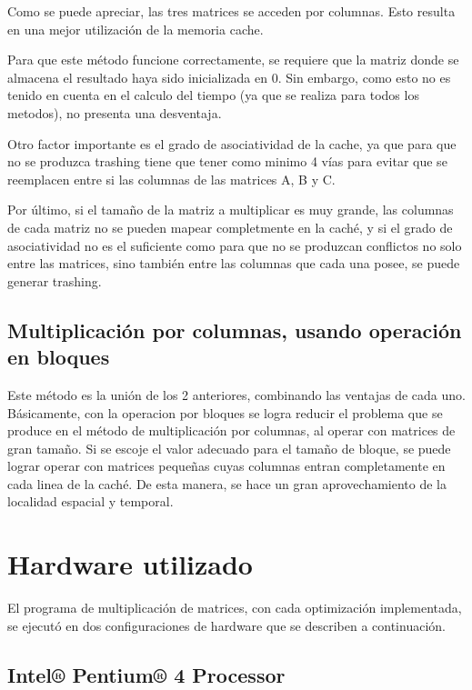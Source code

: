 \documentclass[a4paper,10pt]{article}
\begin{document}
Como se puede apreciar, las tres matrices se acceden por columnas. Esto resulta en una mejor utilización de la memoria cache.

Para que este método funcione correctamente, se requiere que la matriz donde se almacena el resultado haya sido inicializada en 0. Sin embargo, como esto no es tenido en cuenta en el calculo del tiempo (ya que se realiza para todos los metodos), no presenta una desventaja.

Otro factor importante es el grado de asociatividad de la cache, ya que para que no se produzca trashing tiene que tener como minimo 4 vías para evitar que se reemplacen entre si las columnas de las matrices A, B y C.

Por último, si el tamaño de la matriz a multiplicar es muy grande, las columnas de cada matriz no se pueden mapear completmente en la caché, y si el grado de asociatividad no es el suficiente como para que no se produzcan conflictos no solo entre las matrices, sino también entre las columnas que cada una posee, se puede generar trashing.

\subsection{Multiplicación por columnas, usando operación en bloques}

Este método es la unión de los 2 anteriores, combinando las ventajas de cada uno. Básicamente, con la operacion por bloques se logra reducir el problema que se produce en el método de multiplicación por columnas, al operar con matrices de gran tamaño. Si se escoje el valor adecuado para el tamaño de bloque, se puede lograr operar con matrices pequeñas cuyas columnas entran completamente en cada linea de la caché. De esta manera, se hace un gran aprovechamiento de la localidad espacial y temporal.

\clearpage
\section{Hardware utilizado}

El programa de multiplicación de matrices, con cada optimización implementada, se ejecutó en dos configuraciones de hardware que se describen a continuación.

\subsection{Intel® Pentium® 4 Processor}
\end{document}
